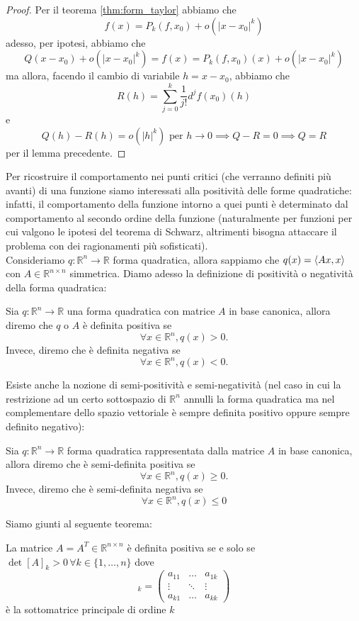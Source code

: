 \documentclass[openany, italian]{book}
\begin{document}
\begin{proof}
Per il teorema \ref{thm:form_taylor} abbiamo che
$$
f(x) = P_k(f, x_0) + o(|x-x_0|^k)
$$
adesso, per ipotesi, abbiamo che
$$
Q(x-x_0)+o(|x-x_0|^k) = f(x) = P_k(f, x_0)(x) + o(|x-x_0|^k)
$$
ma allora, facendo il cambio di variabile $h = x-x_0$, abbiamo che
$$
R(h) = \sum_{j=0}^k \frac{1}{j!} d^j f(x_0)(h)
$$
e
$$
Q(h) - R(h) = o(|h|^k) \text{ per } h \to 0 \implies Q - R = 0 \implies Q=R
$$
per il lemma precedente.
\end{proof}
Per ricostruire il comportamento nei punti critici (che verranno definiti più avanti) di una funzione siamo interessati alla positività delle forme quadratiche: infatti, il comportamento della funzione intorno a quei punti è determinato dal comportamento al secondo ordine della funzione (naturalmente per funzioni per cui valgono le ipotesi del teorema di Schwarz, altrimenti bisogna attaccare il problema con dei ragionamenti più sofisticati). \\
Consideriamo $q: \mathbb{R}^n \to \mathbb{R}$ forma quadratica, allora sappiamo che $q(x) = \langle Ax, x \rangle$ con $A \in \mathbb{R}^{n \times n}$ simmetrica. Diamo adesso la definizione di positività o negatività della forma quadratica:
\begin{definition}
Sia $q:\mathbb{R}^n \to \mathbb{R}$ una forma quadratica con matrice $A$ in base canonica, allora diremo che $q$ o $A$ è definita positiva se
$$
\forall x \in \mathbb{R}^n, q(x) > 0.
$$
Invece, diremo che è definita negativa se
$$
\forall x \in \mathbb{R}^n, q(x) < 0.
$$
\end{definition}
Esiste anche la nozione di semi-positività e semi-negatività (nel caso in cui la restrizione ad un certo sottospazio di $\mathbb{R}^n$ annulli la forma quadratica ma nel complementare dello spazio vettoriale è sempre definita positivo oppure sempre definito negativo):
\begin{definition}
Sia $q: \mathbb{R}^n \to \mathbb{R}$ forma quadratica rappresentata dalla matrice $A$ in base canonica, allora diremo che è semi-definita positiva se
$$
\forall x \in \mathbb{R}^n, q(x) \geq 0.
$$
Invece, diremo che è semi-definita negativa se
$$
\forall x \in \mathbb{R}^n, q(x) \leq 0
$$
\end{definition}
Siamo giunti al seguente teorema:
\begin{theorem}
La matrice $A=A^{T} \in \mathbb{R}^{n \times n}$ è definita positiva se e solo se $\det{[A]}_k > 0 \, \forall k \in \{1, \ldots, n\}$ dove
\begin{equation*}
[A]_k = \begin{pmatrix}
a_{11} & \ldots & a_{1k} \\
\vdots & \ddots & \vdots \\
a_{k1} & \ldots & a_{kk}
\end{pmatrix}
\end{equation*}
è la sottomatrice principale di ordine $k$
\end{theorem}
\end{document}
